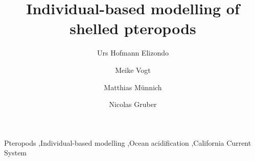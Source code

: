 \documentclass[final,3p,times]{elsarticle}
\begin{document}
\begin{frontmatter}



\title{Individual-based modelling of shelled pteropods}


\author[fn2]{Urs Hofmann Elizondo}
\author[fn2]{Meike Vogt }
\author[fn2]{Matthias M\"{u}nnich }
\author[fn2]{Nicolas Gruber }

\address[fn2]{Environmental Physics Group, Institute of Biogeochemistry and Pollutant Dynamics, ETH Z\"{u}rich, Universit\"{a}strasse 16, 8092 Z\"{u}rich, Switzerland}





\begin{abstract}

\end{abstract}

\begin{keyword}
Pteropods \sep Individual-based modelling  \sep Ocean acidification \sep California Current System


\end{keyword}

\end{frontmatter}
\end{document}
